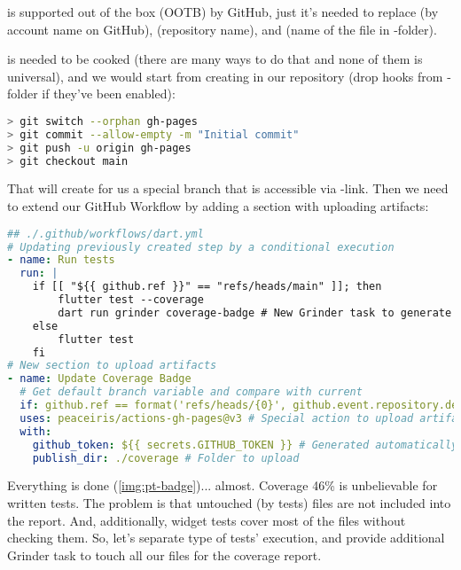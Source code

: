  is supported out of the box (OOTB) by GitHub, just it's needed to replace  (by account name
on GitHub),  (repository name), and  (name of the file in -folder).

 is needed to be cooked (there are many ways to do that and none of them is universal), and we would 
start from creating  in our repository (drop hooks from -folder if they've been enabled):

\begin{lstlisting}[language=bash]
> git switch --orphan gh-pages
> git commit --allow-empty -m "Initial commit"
> git push -u origin gh-pages
> git checkout main
\end{lstlisting}

\noindent That will create for us a special branch that is accessible via -link. 
Then we need to extend our GitHub Workflow by adding a section with uploading artifacts:

\begin{lstlisting}[language=yaml]
## ./.github/workflows/dart.yml
# Updating previously created step by a conditional execution
- name: Run tests
  run: |
    if [[ "${{ github.ref }}" == "refs/heads/main" ]]; then
        flutter test --coverage
        dart run grinder coverage-badge # New Grinder task to generate '.svg'-file with coverage
    else
        flutter test
    fi
# New section to upload artifacts
- name: Update Coverage Badge
  # Get default branch variable and compare with current
  if: github.ref == format('refs/heads/{0}', github.event.repository.default_branch)
  uses: peaceiris/actions-gh-pages@v3 # Special action to upload artifacts
  with:
    github_token: ${{ secrets.GITHUB_TOKEN }} # Generated automatically by GitHub
    publish_dir: ./coverage # Folder to upload
\end{lstlisting}


Everything is done (\cref{img:pt-badge})... almost. Coverage 46\% is unbelievable for written tests. The problem is 
that untouched (by tests) files are not included into the report. And, additionally, widget tests cover most of the 
files without checking them. So, let's separate type of tests' execution, and provide additional Grinder task to 
touch all our files for the coverage report.


